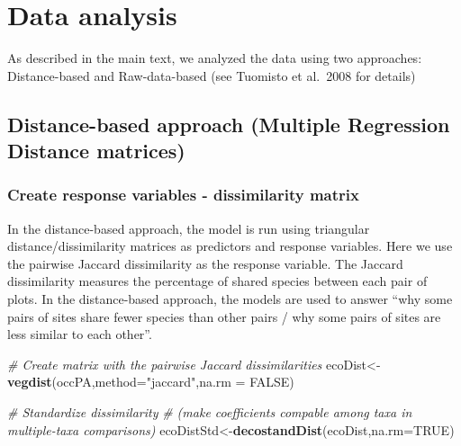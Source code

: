 \documentclass[]{article}
\newenvironment{Shaded}{\begin{snugshade}}{\end{snugshade}}
\newcommand{\CommentTok}[1]{\textcolor[rgb]{0.56,0.35,0.01}{\textit{#1}}}
\newcommand{\DataTypeTok}[1]{\textcolor[rgb]{0.13,0.29,0.53}{#1}}
\newcommand{\KeywordTok}[1]{\textcolor[rgb]{0.13,0.29,0.53}{\textbf{#1}}}
\newcommand{\NormalTok}[1]{#1}
\newcommand{\OtherTok}[1]{\textcolor[rgb]{0.56,0.35,0.01}{#1}}
\newcommand{\StringTok}[1]{\textcolor[rgb]{0.31,0.60,0.02}{#1}}
\begin{document}
\hypertarget{data-analysis}{%
\section{Data analysis}\label{data-analysis}}

As described in the main text, we analyzed the data using two
approaches: Distance-based and Raw-data-based (see Tuomisto et al.~2008
for details)

\hypertarget{distance-based-approach-multiple-regression-distance-matrices}{%
\subsection{Distance-based approach (Multiple Regression Distance
matrices)}\label{distance-based-approach-multiple-regression-distance-matrices}}

\hypertarget{create-response-variables---dissimilarity-matrix}{%
\subsubsection{Create response variables - dissimilarity
matrix}\label{create-response-variables---dissimilarity-matrix}}

In the distance-based approach, the model is run using triangular
distance/dissimilarity matrices as predictors and response variables.
Here we use the pairwise Jaccard dissimilarity as the response variable.
The Jaccard dissimilarity measures the percentage of shared species
between each pair of plots. In the distance-based approach, the models
are used to answer ``why some pairs of sites share fewer species than
other pairs / why some pairs of sites are less similar to each other''.

\begin{Shaded}
\begin{Highlighting}[]
\CommentTok{# Create matrix with the pairwise Jaccard dissimilarities}
\NormalTok{ecoDist<-}\KeywordTok{vegdist}\NormalTok{(occPA,}\DataTypeTok{method=}\StringTok{"jaccard"}\NormalTok{,}\DataTypeTok{na.rm =} \OtherTok{FALSE}\NormalTok{)}

\CommentTok{# Standardize dissimilarity}
\CommentTok{# (make coefficients compable among taxa in multiple-taxa comparisons)}
\NormalTok{ecoDistStd<-}\KeywordTok{decostandDist}\NormalTok{(ecoDist,}\DataTypeTok{na.rm=}\OtherTok{TRUE}\NormalTok{)}
\end{Highlighting}
\end{Shaded}
\end{document}
